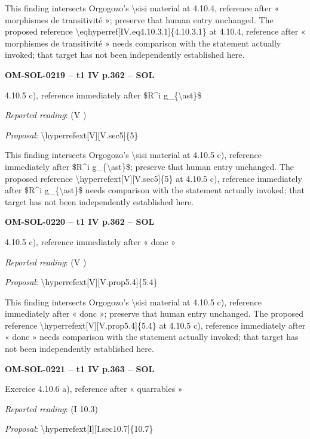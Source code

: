 This finding intersects Orgogozo's \textbackslash{}sisi material at 4.10.4, reference after « morphismes de transitivité »; preserve that human entry unchanged. The proposed reference \textbackslash{}eqhyperref[IV.eq4.10.3.1]\{4.10.3.1\} at 4.10.4, reference after « morphismes de transitivité » needs comparison with the statement actually invoked; that target has not been independently established here.\par
\par\noindent\textbf{OM-SOL-0219 -- t1 IV p.362 -- SOL}\par
4.10.5 c), reference immediately after \$R\textasciicircum{}i g\_\{\textbackslash{}ast\}\$\par
\emph{Reported reading}: (V )\par
\emph{Proposal}: \textbackslash{}hyperrefext[V][V.sec5]\{5\}\par
This finding intersects Orgogozo's \textbackslash{}sisi material at 4.10.5 c), reference immediately after \$R\textasciicircum{}i g\_\{\textbackslash{}ast\}\$; preserve that human entry unchanged. The proposed reference \textbackslash{}hyperrefext[V][V.sec5]\{5\} at 4.10.5 c), reference immediately after \$R\textasciicircum{}i g\_\{\textbackslash{}ast\}\$ needs comparison with the statement actually invoked; that target has not been independently established here.\par
\par\noindent\textbf{OM-SOL-0220 -- t1 IV p.362 -- SOL}\par
4.10.5 c), reference immediately after « donc »\par
\emph{Reported reading}: (V )\par
\emph{Proposal}: \textbackslash{}hyperrefext[V][V.prop5.4]\{5.4\}\par
This finding intersects Orgogozo's \textbackslash{}sisi material at 4.10.5 c), reference immediately after « donc »; preserve that human entry unchanged. The proposed reference \textbackslash{}hyperrefext[V][V.prop5.4]\{5.4\} at 4.10.5 c), reference immediately after « donc » needs comparison with the statement actually invoked; that target has not been independently established here.\par
\par\noindent\textbf{OM-SOL-0221 -- t1 IV p.363 -- SOL}\par
Exercice 4.10.6 a), reference after « quarrables »\par
\emph{Reported reading}: (I 10.3)\par
\emph{Proposal}: \textbackslash{}hyperrefext[I][I.sec10.7]\{10.7\}\par
